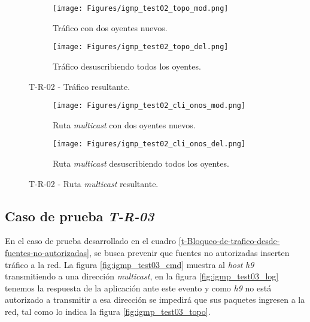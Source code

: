 \begin{figure}[H]    
    \begin{subfigure}[b]{0.5\textwidth}
        \texttt{[image: Figures/igmp\_test02\_topo\_mod.png]}
        \caption{Tráfico con dos oyentes nuevos.}
        \label{fig:igmp_test02_topo_mod}
    \end{subfigure}
    \begin{subfigure}[b]{0.5\textwidth}
        \texttt{[image: Figures/igmp\_test02\_topo\_del.png]}
        \caption{Tráfico desuscribiendo todos los oyentes.}
        \label{fig:igmp_test02_topo_del}
    \end{subfigure}
    \caption[T-R-02 - Tráfico resultante]{T-R-02 - Tráfico resultante.}
    \label{fig:igmp_test02_topo_mod_del}
\end{figure}

\begin{figure}[H]    
    \begin{subfigure}[b]{1\textwidth}
        \texttt{[image: Figures/igmp\_test02\_cli\_onos\_mod.png]}
        \caption{Ruta \textit{multicast} con dos oyentes nuevos.}
        \label{fig:igmp_test02_cli_onos_mod}
    \end{subfigure}
    \begin{subfigure}[b]{1\textwidth}
        \texttt{[image: Figures/igmp\_test02\_cli\_onos\_del.png]}
        \caption{Ruta \textit{multicast} desuscribiendo todos los oyentes.}
        \label{fig:igmp_test02_cli_onos_del}
    \end{subfigure}
    \caption[T-R-02 - Ruta \textit{multicast} resultante]{T-R-02 - Ruta \textit{multicast} resultante.}
    \label{fig:igmp_test02_cli_onos_mod_del}
\end{figure}

\subsection*{Caso de prueba \textit{T-R-03}}

En el caso de prueba desarrollado en el cuadro \ref{t-Bloqueo-de-trafico-desde-fuentes-no-autorizadas}, se busca prevenir que fuentes no autorizadas inserten tráfico a la red. La figura \ref{fig:igmp_test03_cmd} muestra al \textit{host} \textit{h9} transmitiendo a una dirección \textit{multicast}, en la figura \ref{fig:igmp_test03_log} tenemos la respuesta de la aplicación ante este evento y como \textit{h9} no está autorizado a transmitir a esa dirección se impedirá que sus paquetes ingresen a la red, tal como lo indica la figura \ref{fig:igmp_test03_topo}.   

